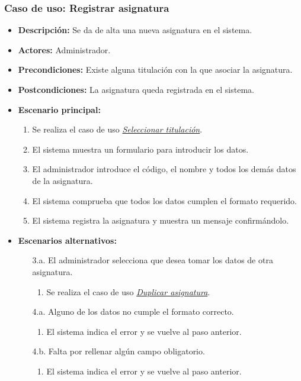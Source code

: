 \subsubsection*{Caso de uso: Registrar asignatura}
\begin{itemize}
\item{\bf Descripción:} Se da de alta una nueva asignatura en el sistema.
\item{\bf Actores:} Administrador.
\item{\bf Precondiciones:} Existe alguna titulación con la que asociar la asignatura.
\item{\bf Postcondiciones:} La asignatura queda registrada en el sistema.
\item{\bf Escenario principal:}
	\begin{enumerate}
 	\item Se realiza el caso de uso {\em\hyperref[select_titulacion]{Seleccionar titulación}}.
	\item El sistema muestra un formulario para introducir los datos.
	\item El administrador introduce el código, el nombre y todos los demás datos de la asignatura.
	\item El sistema comprueba que todos los datos cumplen el formato requerido.
	\item El sistema registra la asignatura y muestra un mensaje confirmándolo.
	\end{enumerate}
\item{\bf Escenarios alternativos:}
	\begin{itemize}
	\item[3.a.] El administrador selecciona que desea tomar los datos de otra asignatura.
		\begin{enumerate}
		\item Se realiza el caso de uso {\em \hyperref[duplicar_asignatura]{Duplicar asignatura}}.
		\end{enumerate}
	\item[4.a.] Alguno de los datos no cumple el formato correcto.
		\begin{enumerate}
		\item El sistema indica el error y se vuelve al paso anterior.
		\end{enumerate}
	\item[4.b.] Falta por rellenar algún campo obligatorio.
		\begin{enumerate}
		\item El sistema indica el error y se vuelve al paso anterior.
		\end{enumerate}

\end{itemize}
\end{itemize}
